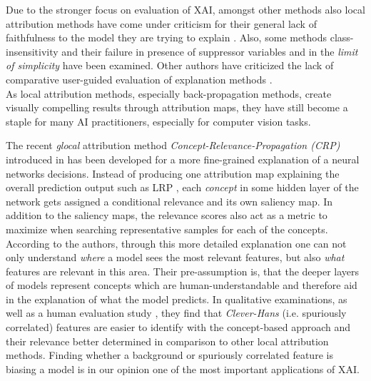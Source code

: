 Due to the stronger focus on evaluation of XAI, amongst other methods also local attribution methods have come under criticism for their general lack of faithfulness to the model they are trying to explain \cite{Adebayo2018, Karimi2023}. Also, some methods class-insensitivity \cite{Sixt2020} and their failure in presence of suppressor variables \cite{Wilming2023} and in the \textit{limit of simplicity} \cite{Kindermans2017} have been examined.  Other authors have criticized the lack of comparative user-guided evaluation of explanation methods \cite{Rong2023}. \\

As local attribution methods, especially back-propagation methods, create visually compelling results through attribution maps, they have still become a staple for many AI practitioners, especially for computer vision tasks. 

The recent \textit{glocal} attribution method \textit{Concept-Relevance-Propagation (CRP)} introduced in \cite{Achtibat2022} has been developed for a more fine-grained explanation of a neural networks decisions. Instead of producing one attribution map explaining the overall prediction output such as LRP \cite{Bach2015}, each \textit{concept} in some hidden layer of the network gets assigned a conditional relevance and its own saliency map. In addition to the saliency maps, the relevance scores also act as a metric to maximize when searching representative samples for each of the concepts. According to the authors, through this more detailed explanation one can not only understand \textit{where} a model sees the most relevant features, but also \textit{what} features are relevant in this area. Their pre-assumption is, that the deeper layers of models represent concepts which are human-understandable and therefore aid in the explanation of what the model predicts. In qualitative examinations, as well as a human evaluation study \cite{Achtibat2023}, they find that \textit{Clever-Hans} (i.e. spuriously correlated) features are easier to identify with the concept-based approach and their relevance better determined in comparison to other local attribution methods. Finding whether a background or spuriously correlated feature is biasing a model is in our opinion one of the most important applications of XAI.
\\

